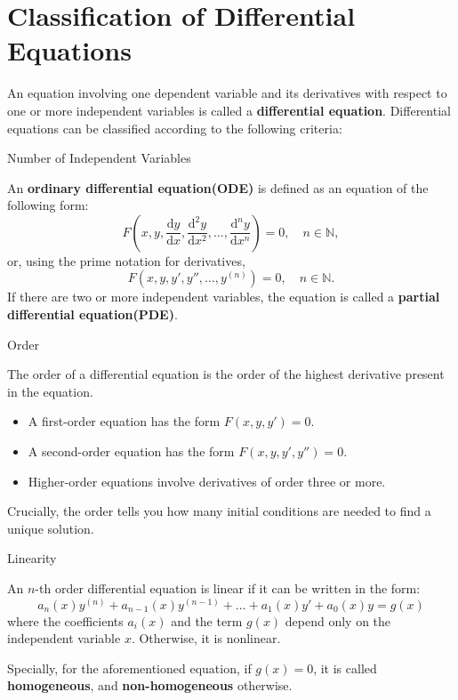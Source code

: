 \documentclass[11pt]{../../TexTemplate/elegantbook}
\begin{document}
\section{Classification of Differential Equations} %
An equation involving one dependent variable and its derivatives with respect to one or more independent variables 
is called a \textbf{differential equation}.
Differential equations can be classified according to the following criteria:
\begin{leftbarTitle}{Number of Independent Variables}\end{leftbarTitle}
An \textbf{ordinary differential equation(ODE)} is defined as an equation of the following form:
\begin{equation}\label{eq:plain ODE}
F\left( x, y, \frac{\mathrm{d}y}{\mathrm{d}x}, \frac{\mathrm{d}^2y}{\mathrm{d}x^2}, \ldots, \frac{\mathrm{d}^ny}{\mathrm{d}x^n} \right) = 0,\quad n \in \mathbb{N},
\end{equation}
or, using the prime notation for derivatives,
\begin{equation*}
F\left( x, y, y', y'', \ldots, y^{(n)} \right) = 0,\quad n \in \mathbb{N}.
\end{equation*}
If there are two or more independent variables, the equation is called a \textbf{partial differential equation(PDE)}.
\begin{leftbarTitle}{Order}\end{leftbarTitle}
The order of a differential equation is the order of the highest derivative present in the equation.
\begin{itemize}
    \item A first-order equation has the form $ F(x, y, y') = 0 $.
    \item A second-order equation has the form $ F(x, y, y', y'') = 0 $.
    \item Higher-order equations involve derivatives of order three or more.
\end{itemize}
\begin{note}
    Crucially, the order tells you how many initial conditions are needed to find a unique solution.
\end{note}
\begin{leftbarTitle}{Linearity}\end{leftbarTitle}
An $n$-th order differential equation is linear if it can be written in the form: 
\begin{equation*}
    a_n(x)y^{(n)} + a_{n-1}(x)y^{(n-1)} + \dots + a_1(x)y' + a_0(x)y = g(x)
\end{equation*}
where the coefficients $a_{i}(x)$ and the term $g(x)$ depend only on the independent variable $x$.
Otherwise, it is nonlinear.
\begin{note}
    Specially, for the aforementioned equation, if $g(x) = 0$, it is called \textbf{homogeneous},
    and \textbf{non-homogeneous} otherwise.
\end{note}
\end{document}
